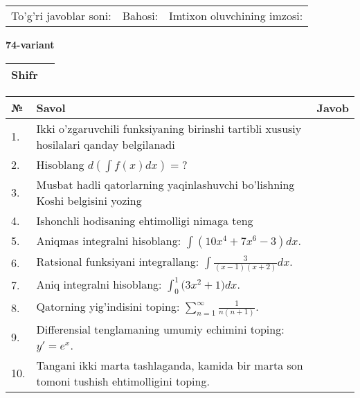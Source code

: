 \documentclass{article}
\begin{document}
  \vspace{1cm}
  
  \begin{tabular}{lll}
  To'g'ri javoblar soni: \underline{\hspace{1.5cm}} & 
  Bahosi: \underline{\hspace{1.5cm}} & 
  Imtixon oluvchining imzosi: \underline{\hspace{2cm}} \\
  \end{tabular}
  
  \egroup
  
  \newpage
  
  
  \textbf{74-variant}\\
  
  \bgroup
  \def\arraystretch{1.6} %
  
  \begin{tabular}{|m{5.7cm}|m{9.5cm}|}
  \hline
  Shifr & \\
  \hline
  \end{tabular}
  
  \vspace{1cm}
  
  \begin{tabular}{|m{0.7cm}|m{10cm}|m{4cm}|}
  \hline
  № & Savol & Javob \\
  \hline
  1. & Ikki o'zgaruvchili funksiyaning birinshi tartibli xususiy hosilalari qanday belgilanadi &  \\
  \hline
  2. & Hisoblang \(d\left( \int {f(x)dx} \right) = ?\) &  \\
  \hline
  3. & Musbat hadli qatorlarning yaqinlashuvchi bo'lishning Koshi belgisini yozing &  \\
  \hline
  4. & Ishonchli hodisaning ehtimolligi nimaga teng &  \\
  \hline
  5. & Aniqmas integralni hisoblang: \(\int {\left( 10x^{4} + 7x^{6} - 3 \right)dx}\). &  \\
  \hline
  6. & Ratsional funksiyani integrallang: \(\int {\frac{3}{(x - 1)(x + 2)}dx}\). &  \\
  \hline
  7. & Aniq integralni hisoblang: \(\int_{0}^{1}{(3x^{2}} + 1)dx\). &  \\
  \hline
  8. & Qatorning yig'indisini toping: \(\sum_{n = 1}^{\infty}\frac{1}{n(n + 1)}\). &  \\
  \hline
  9. & Differensial tenglamaning umumiy echimini toping: \(y' = e^{x}\). &  \\
  \hline
  10. & Tangani ikki marta tashlaganda, kamida bir marta son tomoni tushish ehtimolligini toping. &  \\
  \hline
  \end{tabular}
  
\end{document}
